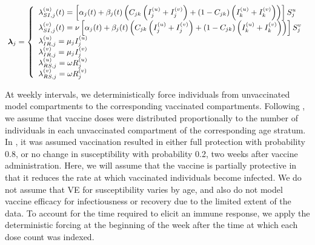 \begin{equation}\small
\label{eqn:flu_sirs_rates}
\boldsymbol{\lambda}_{j} = \left\lbrace
\begin{array}{ll}
\lambda_{SI,j}^{(u)}(t) = \left [\alpha_{j}(t) + \beta_{j}(t)\left (C_{jk}\left (I_{j}^{(u)} + I_{j}^{(v)}\right ) + (1-C_{jk})\left (I_{k}^{(u)} + I_{k}^{(v)}\right )\right )\right ]S_{j}^{u} \\ 
\lambda_{SI,j}^{(v)}(t) = \nu\left [\alpha_{j}(t) + \beta_{j}(t)\left (C_{jk}\left (I_{j}^{(u)} + I_{j}^{(v)}\right ) + (1-C_{jk})\left (I_{k}^{(u)} + I_{k}^{(v)}\right )\right )\right ]S_{j}^{v}\\
\lambda_{IR,j}^{(u)} = \mu_{j} I_{j}^{(u)} \\
\lambda_{IR,j}^{(v)} = \mu_{j} I_{j}^{(v)} \\
\lambda_{RS,j}^{(u)} = \omega R_{j}^{(u)} \\
\lambda_{RS,j}^{(v)} = \omega R_{j}^{(v)}
\end{array}
\right .
\end{equation}

At weekly intervals, we deterministically force individuals from unvaccinated model compartments to the corresponding vaccinated compartments. Following \cite{shubin2016revealing}, we assume that vaccine doses were distributed proportionally to the number of individuals in each unvaccinated compartment of the corresponding age stratum. In \cite{shubin2016revealing}, it was assumed vaccination resulted in either full protection with probability 0.8, or no change in susceptibility with probability 0.2, two weeks after vaccine administration. Here, we will assume that the vaccine is partially protective in that it reduces the rate at which vaccinated individuals become infected. We do not assume that VE for susceptibility varies by age, and also do not model vaccine efficacy for infectiousness or recovery due to the limited extent of the data. To account for the time required to elicit an immune response, we apply the deterministic forcing at the beginning of the week after the time at which each dose count was indexed.


